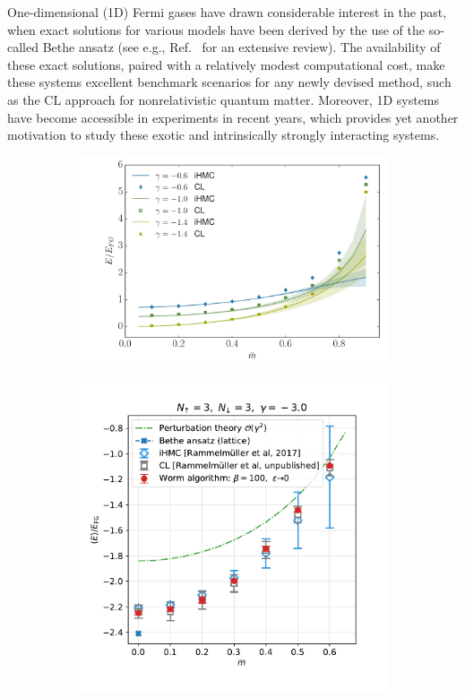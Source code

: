 \documentclass[../main.tex]{subfiles}
\begin{document}
One-dimensional (1D) Fermi gases have drawn considerable interest in the past, when exact solutions for various models have been derived by the use of the so-called Bethe ansatz (see e.g., Ref.~\cite{RevModPhys.85.1633} for an extensive review). The availability of these exact solutions, paired with a relatively modest computational cost, make these systems excellent benchmark scenarios for any newly devised method, such as the CL approach for nonrelativistic quantum matter.  Moreover, 1D systems have become accessible in experiments in recent years, which provides yet another motivation to study these exotic and intrinsically strongly interacting systems.
%
\begin{figure}[t]
  \centering
  \begin{subfigure}[t]{0.56\columnwidth}
    \includegraphics[width=\columnwidth]{./5applications-NREL/1d_ihmc_cl.pdf}
  \end{subfigure}
  \begin{subfigure}[t]{0.4\columnwidth}
    \includegraphics[width=\columnwidth]{./5applications-NREL/1d_duke_compare.pdf}

\end{subfigure}
\end{figure}
\end{document}
